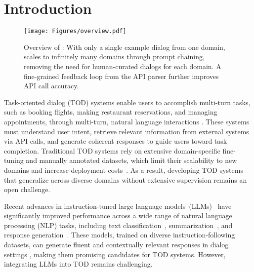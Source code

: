 \section{Introduction}

\begin{figure*}[t!]
    \centering
    \texttt{[image: Figures/overview.pdf]} 
    \vspace{-12pt}
\caption{Overview of {\ours}: With only a single example dialog from one domain, {\ours} scales to infinitely many domains through prompt chaining, removing the need for human-curated dialogs for each domain. A fine-grained feedback loop from the API parser further improves API call accuracy.
}
\vspace{-8pt}
\label{fig:realtod_architecture}
\end{figure*}

Task-oriented dialog (TOD) systems enable users to accomplish multi-turn tasks, such as booking flights, making restaurant reservations, and managing appointments, through multi-turn, natural language interactions \cite{he-etal-2022-space}. These systems must understand user intent, retrieve relevant information from external systems via API calls, and generate coherent responses to guide users toward task completion. 
Traditional TOD systems rely on extensive domain-specific fine-tuning and manually annotated datasets, which limit their scalability to new domains and increase deployment costs~\cite{xu-etal-2024-rethinking, Mi_Wang_Li_2022}. As a result, developing TOD systems that generalize across diverse domains without extensive supervision remains an open challenge.

Recent advances in instruction-tuned large language models~(LLMs)~\cite{Chung2022, shu2024rewritelm} have significantly improved performance across a wide range of natural language processing (NLP) tasks, including text classification~\cite{sun-etal-2023-text, wang2023large, zhang2024pushing}, summarization~\cite{Pu2023SummarizationI, zhang-etal-2024-benchmarking, van2023clinical}, and response generation~\cite{Radford2019LanguageMA, brown2020language}. These models, trained on diverse instruction-following datasets, can generate fluent and contextually relevant responses in dialog settings \cite{Thoppilan2022LaMDALM, dubey2024llama, achiam2023gpt}, making them promising candidates for TOD systems. 
However, integrating LLMs into TOD remains challenging.



